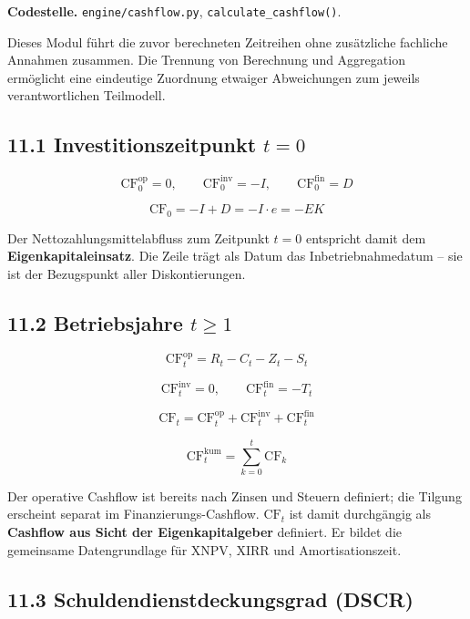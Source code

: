 \documentclass[
  a4paper,
  10pt]{article}
\begin{document}
\textbf{Codestelle.} \nolinkurl{engine/cashflow.py},
\texttt{calculate\_cashflow()}.

Dieses Modul führt die zuvor berechneten Zeitreihen ohne zusätzliche
fachliche Annahmen zusammen. Die Trennung von Berechnung und Aggregation
ermöglicht eine eindeutige Zuordnung etwaiger Abweichungen zum jeweils
verantwortlichen Teilmodell.

\hypertarget{investitionszeitpunkt-t-0}{%
\subsection{\texorpdfstring{11.1 Investitionszeitpunkt
\(t = 0\)}{11.1 Investitionszeitpunkt t = 0}}\label{investitionszeitpunkt-t-0}}

\[ \mathrm{CF}^{\mathrm{op}}_0 = 0, \qquad \mathrm{CF}^{\mathrm{inv}}_0 = -I, \qquad \mathrm{CF}^{\mathrm{fin}}_0 = D \]

\[ \mathrm{CF}_0 = -I + D = -I \cdot e = -EK \]

Der Nettozahlungsmittelabfluss zum Zeitpunkt \(t=0\) entspricht damit
dem \textbf{Eigenkapitaleinsatz}. Die Zeile trägt als Datum das
Inbetriebnahmedatum -- sie ist der Bezugspunkt aller Diskontierungen.

\hypertarget{betriebsjahre-t-geq-1}{%
\subsection{\texorpdfstring{11.2 Betriebsjahre
\(t \geq 1\)}{11.2 Betriebsjahre t \textbackslash geq 1}}\label{betriebsjahre-t-geq-1}}

\[ \mathrm{CF}^{\mathrm{op}}_t = R_t - C_t - Z_t - S_t \]

\[ \mathrm{CF}^{\mathrm{inv}}_t = 0, \qquad \mathrm{CF}^{\mathrm{fin}}_t = -T_t \]

\[ \mathrm{CF}_t = \mathrm{CF}^{\mathrm{op}}_t + \mathrm{CF}^{\mathrm{inv}}_t + \mathrm{CF}^{\mathrm{fin}}_t \]

\[ \mathrm{CF}^{\mathrm{kum}}_t = \sum_{k=0}^{t} \mathrm{CF}_k \]

Der operative Cashflow ist bereits nach Zinsen und Steuern definiert;
die Tilgung erscheint separat im Finanzierungs-Cashflow.
\(\mathrm{CF}_t\) ist damit durchgängig als \textbf{Cashflow aus Sicht
der Eigenkapitalgeber} definiert. Er bildet die gemeinsame
Datengrundlage für XNPV, XIRR und Amortisationszeit.

\hypertarget{schuldendienstdeckungsgrad-dscr}{%
\subsection{11.3 Schuldendienstdeckungsgrad
(DSCR)}\label{schuldendienstdeckungsgrad-dscr}}
\end{document}
